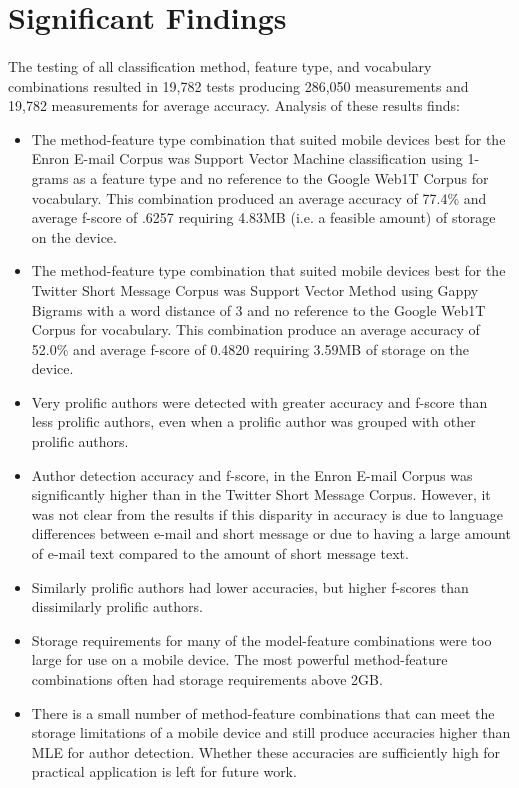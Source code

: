 \section{Significant Findings}
\paragraph*{} The testing of all classification method, feature type, and vocabulary combinations resulted in 19,782 tests producing 286,050 measurements and 19,782 measurements for average accuracy.  Analysis of these results finds:
\begin{itemize} 
	\item The method-feature type combination that suited mobile devices best for the Enron E-mail Corpus was Support Vector Machine classification using 1-grams as a feature type and no reference to the Google Web1T Corpus for vocabulary.  This combination produced an average accuracy of 77.4\% and average f-score of .6257 requiring 4.83MB (i.e. a feasible amount) of storage on the device.
	\item The method-feature type combination that suited mobile devices best for the Twitter Short Message Corpus was Support Vector Method using Gappy Bigrams with a word distance of 3 and no reference to the Google Web1T Corpus for vocabulary. This combination produce an average accuracy of 52.0\% and average f-score of 0.4820 requiring 3.59MB of storage on the device.
	\item Very prolific authors were detected with greater accuracy and f-score than less prolific authors, even when a prolific author was grouped with other prolific authors.
	\item Author detection accuracy and f-score, in the Enron E-mail Corpus was significantly higher than in the Twitter Short Message Corpus. However, it was not clear from the results if this disparity in accuracy is due to language differences between e-mail and short message or due to having a large amount of e-mail text compared to the amount of short message text.
	\item Similarly prolific authors had lower accuracies, but higher f-scores than dissimilarly prolific authors.    
	\item Storage requirements for many of the model-feature combinations were too large for use on a mobile device.  The most powerful method-feature combinations often had storage requirements above 2GB.
	\item There is a small number of method-feature combinations that can meet the storage limitations of a mobile device and still produce accuracies higher than MLE for author detection.  Whether these accuracies are sufficiently high for practical application is left for future work.
\end{itemize}
	

